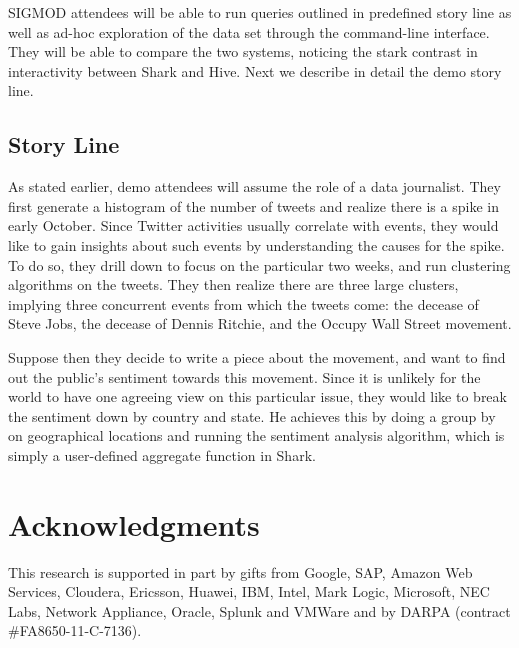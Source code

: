 \documentclass[preprint]{acm_proc_article-sp}
\begin{document}
SIGMOD attendees will be able to run queries outlined in predefined story line as well as ad-hoc exploration of the data set through the command-line interface. They will be able to compare the two systems, noticing the stark contrast in interactivity between Shark and Hive. Next we describe in detail the demo story line.

\subsection{Story Line}

As stated earlier, demo attendees will assume the role of a data journalist. They first generate a histogram of the number of tweets and realize there is a spike in early October. Since Twitter activities usually correlate with events, they would like to gain insights about such events by understanding the causes for the spike. To do so, they drill down to focus on the particular two weeks, and run clustering algorithms on the tweets. They then realize there are three large clusters, implying three concurrent events from which the tweets come: the decease of Steve Jobs, the decease of Dennis Ritchie, and the Occupy Wall Street movement.

Suppose then they decide to write a piece about the movement, and want to find out the public's sentiment towards this movement. Since it is unlikely for the world to have one agreeing view on this particular issue, they would like to break the sentiment down by country and state. He achieves this by doing a group by on geographical locations and running the sentiment analysis algorithm, which is simply a user-defined aggregate function in Shark.


\section{Acknowledgments}
This research is supported in part by gifts from Google, SAP, Amazon Web Services, Cloudera, Ericsson, Huawei, IBM, Intel, Mark Logic, Microsoft, NEC Labs, Network Appliance, Oracle, Splunk and VMWare and by DARPA (contract \#FA8650-11-C-7136).




\balancecolumns
\end{document}
